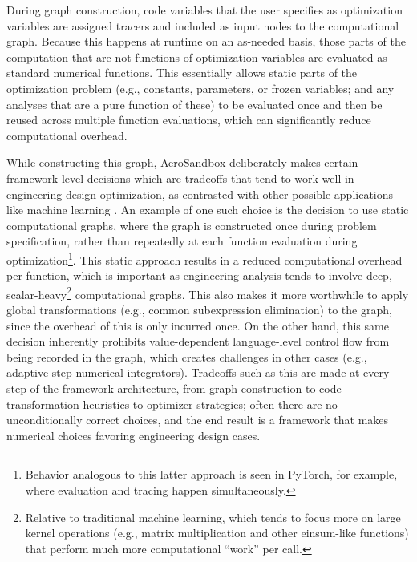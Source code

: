 During graph construction, code variables that the user specifies as optimization variables are assigned tracers and included as input nodes to the computational graph. Because this happens at runtime on an as-needed basis, those parts of the computation that are not functions of optimization variables are evaluated as standard numerical functions. This essentially allows static parts of the optimization problem (e.g., constants, parameters, or frozen variables; and any analyses that are a pure function of these) to be evaluated once and then be reused across multiple function evaluations, which can significantly reduce computational overhead.

While constructing this graph, AeroSandbox deliberately makes certain framework-level decisions which are tradeoffs that tend to work well in engineering design optimization, as contrasted with other possible applications like machine learning \cite{rackauckas_engineering_2021}. An example of one such choice is the decision to use static computational graphs, where the graph is constructed once during problem specification, rather than repeatedly at each function evaluation during optimization\footnote{Behavior analogous to this latter approach is seen in PyTorch, for example, where evaluation and tracing happen simultaneously.}. This static approach results in a reduced computational overhead per-function, which is important as engineering analysis tends to involve deep, scalar-heavy\footnote{Relative to traditional machine learning, which tends to focus more on large kernel operations (e.g., matrix multiplication and other einsum-like functions) that perform much more computational ``work'' per call.} computational graphs. This also makes it more worthwhile to apply global transformations (e.g., common subexpression elimination) to the graph, since the overhead of this is only incurred once. On the other hand, this same decision inherently prohibits value-dependent language-level control flow from being recorded in the graph, which creates challenges in other cases (e.g., adaptive-step numerical integrators). Tradeoffs such as this are made at every step of the framework architecture, from graph construction to code transformation heuristics to optimizer strategies; often there are no unconditionally correct choices, and the end result is a framework that makes numerical choices favoring engineering design cases.

